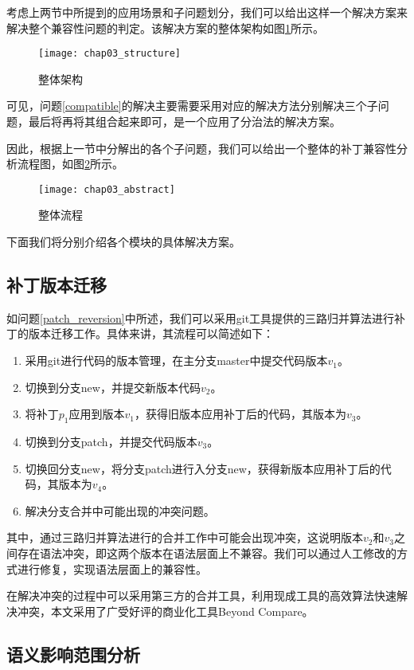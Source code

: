 考虑上两节中所提到的应用场景和子问题划分，我们可以给出这样一个解决方案来解决整个兼容性问题的判定。该解决方案的整体架构如图\ref {structure}所示。

\begin{figure}[H]
	\centering
	\texttt{[image: chap03\_structure]}
	\caption {整体架构}	
	\label {structure}
\end{figure}

可见，问题\ref{compatible}的解决主要需要采用对应的解决方法分别解决三个子问题，最后将再将其组合起来即可，是一个应用了分治法的解决方案。

因此，根据上一节中分解出的各个子问题，我们可以给出一个整体的补丁兼容性分析流程图，如图\ref {all_flow}所示。

\begin{figure}[H]
	\centering
	\texttt{[image: chap03\_abstract]}
	\caption {整体流程}
	\label {all_flow}	
\end{figure}

下面我们将分别介绍各个模块的具体解决方案。

\subsection{补丁版本迁移}

如问题\ref {patch_reversion}中所述，我们可以采用git工具提供的三路归并算法进行补丁的版本迁移工作。具体来讲，其流程可以简述如下：
\begin{enumerate}
	\item 采用git进行代码的版本管理，在主分支master中提交代码版本$v_1$。
	\item 切换到分支new，并提交新版本代码$v_2$。
	\item 将补丁$p_1$应用到版本$v_1$，获得旧版本应用补丁后的代码，其版本为$v_3$。
	\item 切换到分支patch，并提交代码版本$v_3$。
	\item 切换回分支new，将分支patch进行入分支new，获得新版本应用补丁后的代码，其版本为$v_4$。
	\item 解决分支合并中可能出现的冲突问题。
\end{enumerate}

其中，通过三路归并算法进行的合并工作中可能会出现冲突，这说明版本$v_2$和$v_3$之间存在语法冲突，即这两个版本在语法层面上不兼容。我们可以通过人工修改的方式进行修复，实现语法层面上的兼容性。

在解决冲突的过程中可以采用第三方的合并工具，利用现成工具的高效算法快速解决冲突，本文采用了广受好评的商业化工具Beyond Compare。

\subsection{语义影响范围分析}

